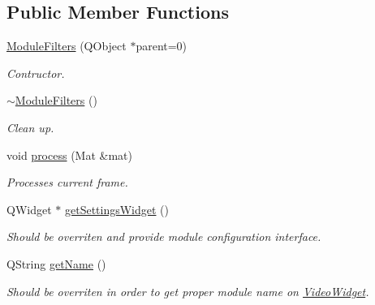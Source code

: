 \subsection*{Public Member Functions}
\begin{DoxyCompactItemize}
\item 
\hyperlink{class_module_filters_a4cff5ce34139e1404464918808469a30}{ModuleFilters} (QObject $\ast$parent=0)
\begin{DoxyCompactList}\small\item\em Contructor. \item\end{DoxyCompactList}\item 
\hypertarget{class_module_filters_ac4e78f8dec4806c394045cb47d68e1cd}{
\hyperlink{class_module_filters_ac4e78f8dec4806c394045cb47d68e1cd}{$\sim$ModuleFilters} ()}
\label{d9/d65/class_module_filters_ac4e78f8dec4806c394045cb47d68e1cd}

\begin{DoxyCompactList}\small\item\em Clean up. \item\end{DoxyCompactList}\item 
void \hyperlink{class_module_filters_a8bebe9b8920c884811184be14ad25229}{process} (Mat \&mat)
\begin{DoxyCompactList}\small\item\em Processes current frame. \item\end{DoxyCompactList}\item 
QWidget $\ast$ \hyperlink{class_module_filters_abce7f07b738eac63a89e8674fb07de7b}{getSettingsWidget} ()
\begin{DoxyCompactList}\small\item\em Should be overriten and provide module configuration interface. \item\end{DoxyCompactList}\item 
QString \hyperlink{class_module_filters_a79ff5c49fcd619af1ce4ad68c2520d7f}{getName} ()
\begin{DoxyCompactList}\small\item\em Should be overriten in order to get proper module name on \hyperlink{class_video_widget}{VideoWidget}. \item\end{DoxyCompactList}\end{DoxyCompactItemize}


